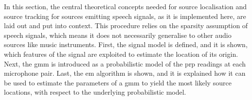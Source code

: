 In this section, the central theoretical concepts needed for source localisation and source tracking for sources emitting speech signals, as it is implemented here, are laid out and put into context. This procedure relies on the sparsity assumption of speech signals, which means it does not necessarily generalise to other audio sources like music instruments. First, the signal model is defined, and it is shown, which features of the signal are exploited to estimate the location of its origin. Next, the \gls{gmm} is introduced as a probabilistic model of the \gls{prp} readings at each microphone pair. Last, the \gls{em} algorithm is shown, and it is explained how it can be used to estimate the parameters of a \gls{gmm} to yield the most likely source locations, with respect to the underlying probabilistic model.
